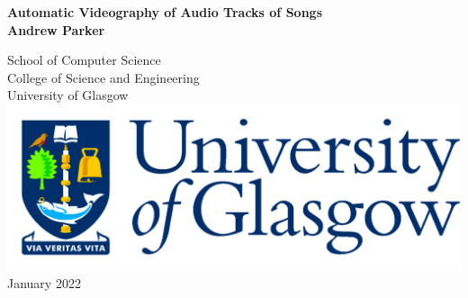 \documentclass[12pt,titlepage,oneside]{book}
\begin{document}
\begin{titlepage}
\centering
\vspace*{3cm}  %
\bfseries\Large
Automatic Videography of Audio Tracks of Songs\\
\vspace{3cm}
\normalfont\large
Andrew Parker\\
\vspace{2cm}

School of Computer Science\\
College of Science and Engineering\\
University of Glasgow\\
\vspace{2cm}
\includegraphics[scale=0.125]{GlaLogo.pdf}
\\
\vspace{1cm}
January 2022
\end{titlepage}
\frontmatter  %

\tableofcontents
\listoftables
\listoffigures


\mainmatter %







\appendix


\backmatter  %

\end{document}
